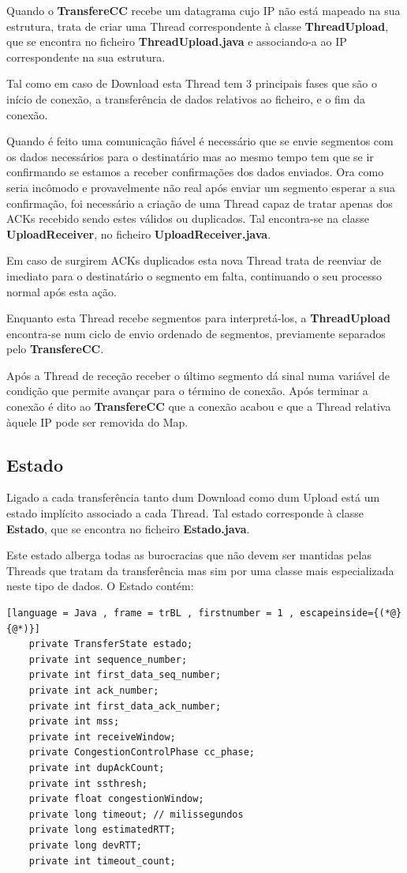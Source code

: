 \documentclass{llncs}
\begin{document}
Quando o \textbf{TransfereCC} recebe um datagrama cujo IP não está mapeado na sua estrutura, trata de criar uma Thread correspondente à classe \textbf{ThreadUpload}, que se encontra no ficheiro \textbf{ThreadUpload.java} e associando-a ao IP correspondente na sua estrutura.

Tal como em caso de Download esta Thread tem 3 principais fases que são o início de conexão, a transferência de dados relativos ao ficheiro, e o fim da conexão.

Quando é feito uma comunicação fiável é necessário que se envie segmentos com os dados necessários para o destinatário mas ao mesmo tempo tem que se ir confirmando se estamos a receber confirmações dos dados enviados. Ora como seria incômodo e provavelmente não real após enviar um segmento esperar a sua confirmação, foi necessário a criação de uma Thread capaz de tratar apenas dos ACKs recebido sendo estes válidos ou duplicados. Tal encontra-se na classe \textbf{UploadReceiver}, no ficheiro \textbf{UploadReceiver.java}.

Em caso de surgirem ACKs duplicados esta nova Thread trata de reenviar de imediato para o destinatário o segmento em falta, continuando o seu processo normal após esta ação.

Enquanto esta Thread recebe segmentos para interpretá-los, a \textbf{ThreadUpload} encontra-se num ciclo de envio ordenado de segmentos, previamente separados pelo \textbf{TransfereCC}.

Após a Thread de receção receber o último segmento dá sinal numa variável de condição que permite avançar para o término de conexão. Após terminar a conexão é dito ao \textbf{TransfereCC} que a conexão acabou e que a Thread relativa àquele IP pode ser removida do Map.


\subsection{Estado}

Ligado a cada transferência tanto dum Download como dum Upload está um estado implícito associado a cada Thread. Tal estado corresponde à classe \textbf{Estado}, que se encontra no ficheiro \textbf{Estado.java}.

Este estado alberga todas as burocracias que não devem ser mantidas pelas Threads que tratam da transferência mas sim por uma classe mais especializada neste tipo de dados. O Estado contém:

\begin{lstlisting}[language = Java , frame = trBL , firstnumber = 1 , escapeinside={(*@}{@*)}]
    private TransferState estado;
    private int sequence_number;
    private int first_data_seq_number;
    private int ack_number;
    private int first_data_ack_number;
    private int mss;
    private int receiveWindow;
    private CongestionControlPhase cc_phase;
    private int dupAckCount;
    private int ssthresh;
    private float congestionWindow;
    private long timeout; // milissegundos
    private long estimatedRTT;
    private long devRTT;
    private int timeout_count;
\end{lstlisting}
\end{document}
